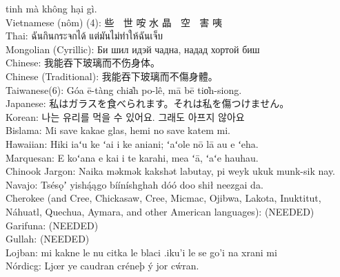 \documentclass{report}
\begin{document}
tinh mà không hại gì.\\{} Vietnamese (nôm) (4): 些 𣎏 世 咹 水 晶 𦓡 空 𣎏 害 咦\\{} Thai: ฉันกินกระจกได้ แต่มันไม่ทำให้ฉันเจ็บ\\{} Mongolian (Cyrillic): Би шил идэй чадна, надад хортой биш\\{} Chinese: 我能吞下玻璃而不伤身体。\\{} Chinese (Traditional): 我能吞下玻璃而不傷身體。\\{} Taiwanese(6): Góa ē{-}tàng chia̍h po{-}lê, mā bē tio̍h{-}siong.\\{} Japanese: 私はガラスを食べられます。それは私を傷つけません。\\{} Korean: 나는 유리를 먹을 수 있어요. 그래도 아프지 않아요\\{} Bislama: Mi save kakae glas, hemi no save katem mi.\\{} Hawaiian: Hiki iaʻu ke ʻai i ke aniani; ʻaʻole nō lā au e ʻeha.\\{} Marquesan: E koʻana e kai i te karahi, mea ʻā, ʻaʻe hauhau.\\{} Chinook Jargon: Naika məkmək kakshət labutay, pi weyk ukuk munk{-}sik nay.\\{} Navajo: Tsésǫʼ yishą́ągo bííníshghah dóó doo shił neezgai da.\\{} Cherokee (and Cree, Chickasaw, Cree, Micmac, Ojibwa, Lakota, Inuktitut, Náhuatl, Quechua, Aymara, and other American languages): (NEEDED)\\{} Garifuna: (NEEDED)\\{} Gullah: (NEEDED)\\{} Lojban: mi kakne le nu citka le blaci .iku'i le se go'i na xrani mi\\{} Nórdicg: Ljœr ye caudran créneþ ý jor cẃran.\\{}
\end{document}
